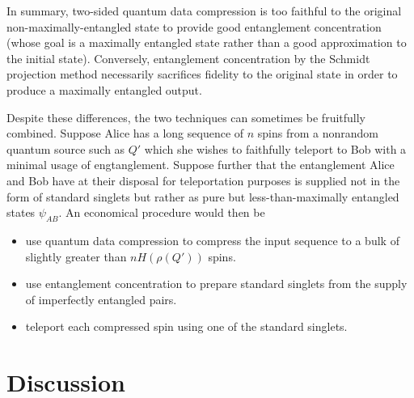 In summary, two-sided quantum data compression is too faithful to the
original non-maximally-entangled state to provide good entanglement
concentration (whose goal is a maximally entangled state rather than a
good approximation to the initial state).  Conversely, entanglement
concentration by the Schmidt projection method necessarily sacrifices
fidelity to the original state in order to produce a maximally entangled
output.
 
Despite these differences, the two techniques can sometimes be fruitfully
combined.  Suppose Alice has a long sequence of $n$ spins from a
nonrandom quantum source such as $Q'$ which she wishes to faithfully
teleport to Bob with a minimal usage of
engtanglement.  Suppose further that the entanglement Alice and Bob
have at their disposal for teleportation purposes is supplied not
in the form of standard singlets but rather as pure but less-than-maximally
entangled states $\psi_{AB}$.  An economical procedure would then be
 \begin{itemize}
 \item use quantum data compression to compress the
input sequence to a bulk of slightly greater than $nH(\rho(Q'))$ spins.
\item use entanglement concentration to prepare standard singlets
from the supply of imperfectly entangled pairs.
 \item teleport each compressed spin using one of the standard singlets.
\end{itemize}
 
 
\section{Discussion}
 
